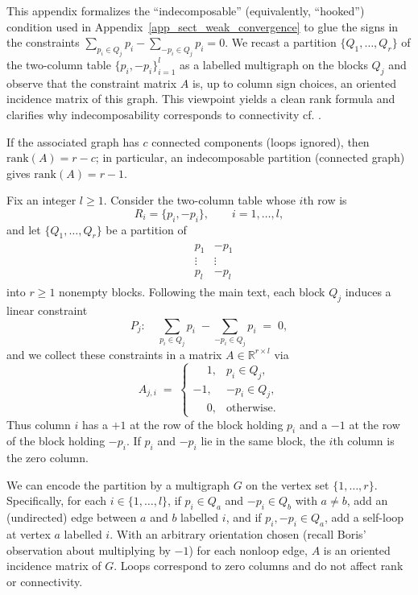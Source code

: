 \documentclass[11pt]{article}
\numberwithin{equation}{section}
\theoremstyle{plain}
\theoremstyle{definition}
\theoremstyle{definition}
\theoremstyle{assumption}
\theoremstyle{proposition}
\theoremstyle{proposition}
\theoremstyle{example}
\theoremstyle{lemma}
\theoremstyle{theorem}
\theoremstyle{remark}
\begin{document}
    This appendix formalizes the ``indecomposable” (equivalently, ``hooked”) condition used in Appendix~\ref{app_sect_weak_convergence} to glue the signs in the constraints
\(\sum_{p_i\in Q_j} p_i-\sum_{-p_i\in Q_j} p_i=0\).
We recast a partition \(\{Q_1,\dots,Q_r\}\) of the two-column table \(\{p_i,-p_i\}_{i=1}^l\) as a labelled multigraph on the blocks \(Q_j\) and observe that the constraint matrix \(A\) is, up to column sign choices, an oriented incidence matrix of this graph. This viewpoint yields a clean rank formula and clarifies why indecomposability corresponds to connectivity cf. \citet[Theorem 2.3.2]{Brillinger2001}.


If the associated graph has \(c\) connected components (loops ignored), then \(\mathrm{rank}(A)=r-c\); in particular, an indecomposable partition (connected graph) gives \(\mathrm{rank}(A)=r-1\).


\noindent Fix an integer $l\ge 1$. Consider the two-column table whose $i$th row is
\[
R_i=\{ p_i, -p_i \}, \qquad i=1,\dots,l,
\]
and let $\{Q_1,\dots,Q_r\}$ be a partition of 
\begin{align*}
\begin{matrix}
&p_1&-p_1 \\
&\vdots&\vdots \\
&p_l&-p_l
\end{matrix}
\end{align*}
into $r\ge 1$ nonempty blocks. Following the main text, each block $Q_j$ induces a linear constraint
\[
P_j:\quad \sum_{p_i\in Q_j} p_i \;-\!\!\! \sum_{-p_i\in Q_j} p_i \;=\; 0 ,
\]
and we collect these constraints in a matrix $A\in\mathbb{R}^{r\times l}$ via
\[
A_{j,i} \;=\;
\begin{cases}
\phantom{-}1, & p_i\in Q_j,\\
-1, & -p_i\in Q_j,\\
\phantom{-}0, & \text{otherwise}.
\end{cases}
\]
Thus column $i$ has a $+1$ at the row of the block holding $p_i$ and a $-1$ at the row of the block holding $-p_i$. If $p_i$ and $-p_i$ lie in the same block, the $i$th column is the zero column.

We can encode the partition by a multigraph $G$ on the vertex set $\{1,\dots,r\}$. Specifically,
for each $i\in\{1,\dots,l\}$, if $p_i\in Q_a$ and $-p_i\in Q_b$ with $a\ne b$, add an (undirected) edge between $a$ and $b$ labelled $i$, and if $p_i,-p_i\in Q_a$, add a self-loop at vertex $a$ labelled $i$. With an arbitrary orientation chosen (recall Boris' observation about multiplying by $-1$) for each nonloop edge, $A$ is  an oriented incidence matrix of $G$. Loops correspond to zero columns and do not affect rank or connectivity.
\end{document}

